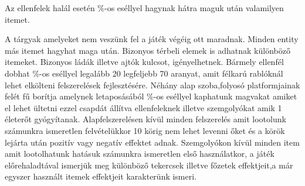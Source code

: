 
Az ellenfelek halál esetén \%-os eséllyel hagynak hátra maguk után valamilyen itemet.

A tárgyak amelyeket nem veszünk fel a játék végéig ott maradnak.
Minden entity más itemet hagyhat maga után.
Bizonyos térbeli elemek is adhatnak különböző itemeket.
Bizonyos ládák illetve ajtók kulcsot, igényelhetnek.
Bármely ellenfél dobhat \%-os eséllyel legalább 20 legfeljebb 70 aranyat, amit félkarú rablóknál lehet elkölteni felszerelések fejlesztésére.
Néhány alap szoba,folyosó platformjainak felét fű borítja amelynek letaposásából \%-os eséllyel kaphatunk magvakat amiket el lehet ültetni ezzel csapdát állítva ellenfeleknek illetve szemgolyókat amik 1 életerőt gyógyítanak.
Alapfelszerelésen kívül minden felszerelés amit lootolunk számunkra ismeretlen felvételükkor 10 körig nem lehet levenni őket és a körök lejárta után pozitív vagy negatív effektet adnak.
Szemgolyókon kívül minden item amit lootolhatunk hatásuk számunkra ismeretlen első használatkor, a játék előrehaladtával ismerjük meg különböző tekercsek illetve főzetek effektjeit,a már egyszer használt itemek effektjeit karakterünk ismeri.


